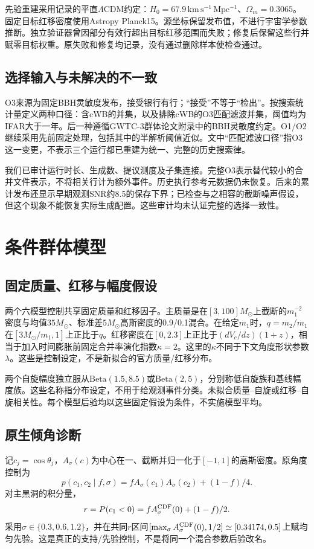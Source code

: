 先验重建采用记录的平直$\Lambda$CDM约定：$H_0=67.9\,\mathrm{km\,s^{-1}\,Mpc^{-1}}$、$\Omega_m=0.3065$。固定目标红移密度使用Astropy Planck15。源坐标保留发布值，不进行宇宙学参数推断。独立验证器曾因部分有效行超出目标红移范围而失败；修复后保留这些行并赋零目标权重。原失败和修复均记录，没有通过删除样本使检查通过。

\subsection{选择输入与未解决的不一致}
O3来源为固定BBH灵敏度发布\cite{o3}，接受银行有\DataOThreeRows{}行；“接受”不等于“检出”。按搜索统计量定义两种口径：含cWB的并集，以及排除cWB的O3匹配滤波并集，阈值均为IFAR大于一年。后一种遵循GWTC-3群体论文附录中的BBH灵敏度约定\cite{lvk3}。O1/O2继续采用先前固定处理，包括其中的半解析阈值近似。文中“匹配滤波口径”指O3这一变更，不表示三个运行都已重建为统一、完整的历史搜索律。

我们已审计运行时长、生成数、提议测度及子集连接。完整O3表示替代较小的合并文件表示，不将相关行计为额外事件。历史执行参考元数据仍未恢复。后来的累计发布还显示早期观测SNR约8.5的保存下界；已检查与之相容的截断噪声假设，但这个现象不能恢复实际生成配置。这些审计均未认证完整的选择一致性。

\section{条件群体模型}\label{sec:models}
\subsection{固定质量、红移与幅度假设}
两个六模型控制共享固定质量和红移因子。主质量是在$[3,100]M_\odot$上截断的$m_1^{-2}$密度与均值$35M_\odot$、标准差$5M_\odot$高斯密度的0.9/0.1混合。在给定$m_1$时，$q=m_2/m_1$在$[3M_\odot/m_1,1]$上正比于$q$。红移密度在$[0,2.3]$上正比于$(dV_c/dz)(1+z)$，相当于加入时间膨胀前固定合并率演化指数$\kappa=2$。这里的$\kappa$不同于下文角度形状参数$\lambda$。这些是控制设定，不是新拟合的官方质量/红移分布。

两个自旋幅度独立服从$\mathrm{Beta}(1.5,8.5)$或$\mathrm{Beta}(2,5)$，分别称低自旋族和基线幅度族。这些名称指分布设定，不用于给观测事件分类。未拟合质量--自旋或红移--自旋相关性。每个模型后验均以这些固定假设为条件，不实施模型平均。

\subsection{原生倾角诊断}
记$c_j=\cos\theta_j$，$A_\sigma(c)$为中心在一、截断并归一化于$[-1,1]$的高斯密度。原角度控制为
\begin{equation}
 p(c_1,c_2\mid f,\sigma)=f A_\sigma(c_1)A_\sigma(c_2)+(1-f)/4.
\end{equation}
对主黑洞的积分量，
\begin{equation}
 r=P(c_1<0)=f A_\sigma^{\rm CDF}(0)+(1-f)/2.\label{eq:r}
\end{equation}
采用$\sigma\in\{0.3,0.6,1.2\}$，并在共同$r$区间$[\max_\sigma A_\sigma^{\rm CDF}(0),1/2]\simeq[0.34174,0.5]$上赋均匀先验。这是真正的支持/先验控制，不是将同一个混合参数后验改名。

